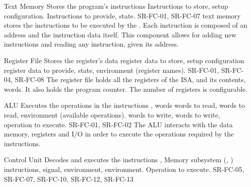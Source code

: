 \begin{component}{Text Memory}
  {Stores the program's instructions}  %
  {\NA}  %
  {Instructions to store, setup configuration.}  %
  {Instructions to provide, state.}  %
  {SR-FC-01, SR-FC-07}  %
  \Gls{text memory} stores the instructions to be executed by the . Each instruction is composed of an address and the instruction data itself. This component allows for adding new instructions and reading any instruction, given its address.
\end{component}

\begin{component}{Register File}
  {Stores the \gls{register}'s data}  %
  {\NA}  %
  {\Gls{register} data to store, setup configuration}  %
  {\Gls{register} data to provide, state, environment (register names).}  %
  {SR-FC-01, SR-FC-04, SR-FC-08}  %
  The \gls{register} file holds all the \glspl{register} of the \gls{ISA}, and its contents, \glspl{word}. It also holds the \gls{program counter}. The number of \glspl{register} is configurable.
\end{component}

\begin{component}{ALU}
  {Executes the operations in the instructions}  %
  {,  words}  %
  { words to read,  words to read, environment (available operations).}  %
  { words to write,  words to write, operation to execute.}  %
  {SR-FC-01, SR-FC-02}  %
  The \gls{ALU} interacts with the \gls{data memory}, \glspl{register} and \gls{I/O} in order to execute the operations required by the instructions.
\end{component}

\begin{component}{Control Unit}
  {Decodes and executes the instructions}  %
  {, Memory subsystem (, )}  %
  { instructions,  signal,  environment,  environment.}  %
  {Operation to execute.}  %
  {SR-FC-05, SR-FC-07, SR-FC-10, SR-FC-12, SR-FC-13}  %
\end{component}


